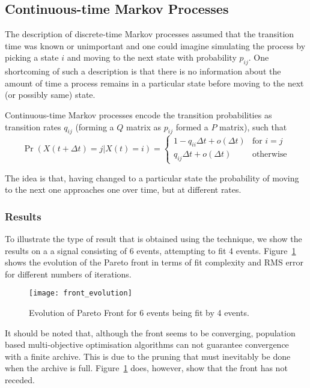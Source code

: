 \subsection{Continuous-time Markov Processes}
The description of discrete-time Markov processes assumed that the
transition time was known or unimportant and one could imagine
simulating the process by picking a state $i$ and moving to the next
state with probability $p_{ij}$.  One shortcoming of such a
description is that there is no information about the amount of time a
process remains in a particular state before moving to the next (or
possibly same) state.  

Continuous-time Markov processes encode the transition probabilities as
transition rates $q_{ij}$ (forming a $Q$ matrix as $p_{ij}$ formed a
$P$ matrix), such that
\begin{equation}
  \label{eq:contmarkov}
  \Pr(X(t+\Delta t) = j | X(t) = i) = 
  \begin{cases}
    1 - q_{ii}\Delta t + o(\Delta t) & \text{for } i = j \\
    q_{ij}\Delta t + o(\Delta t) & \text{otherwise}
  \end{cases}
\end{equation}

The idea is that, having changed to a particular state the probability of moving to the next one approaches one over time, but at different rates.


\subsubsection{Results}
To illustrate the type of result that is obtained using the technique,
we show the results on a a signal consisting of 6 events, attempting
to fit 4 events.  Figure~\ref{fig:front_evolution} shows the evolution
of the Pareto front in terms of fit complexity and RMS error for
different numbers of iterations.

\begin{figure}[htbp]
  \centering
  \texttt{[image: front\_evolution]}
  \caption{Evolution of Pareto Front for 6 events being fit by 4 events.}
  \label{fig:front_evolution}
\end{figure}

It should be noted that, although the front seems to be converging,
population based multi-objective optimisation algorithms can not
guarantee convergence with a finite archive.  This is due to the
pruning that must inevitably be done when the archive is full.
Figure~\ref{fig:front_evolution} does, however, show that the front has not
receded.

